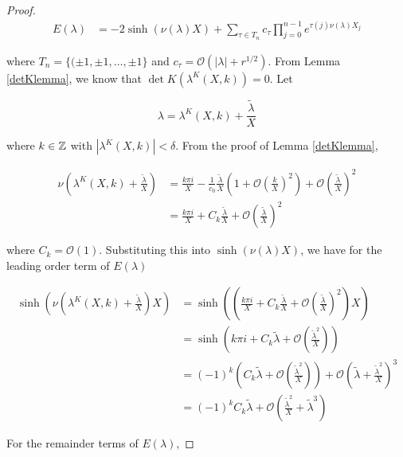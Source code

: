 \documentclass[thesis.tex]{subfiles}
\begin{document}
\begin{lemma}
\begin{proof}
\begin{align*}
E(\lambda)
&= -2 \sinh(\nu(\lambda)X) + \sum_{\tau \in T_n}
c_\tau \prod_{j = 0}^{n-1} e^{\tau(j) \nu(\lambda)X_j}
\end{align*}

where $T_n = \{ (\pm 1, \pm 1, \dots, \pm 1 \}$ and $c_\tau = \mathcal{O}(|\lambda| + r^{1/2})$. From Lemma \ref{detKlemma}, we know that $\det K(\lambda^K(X,k)) = 0$. Let

\[
\lambda = \lambda^K(X,k) + \frac{\tilde{\lambda}}{X}
\]

where $k \in {\mathbb Z}$ with $|\lambda^K(X,k)|  < \delta$. From the proof of Lemma \ref{detKlemma}, 

\begin{align*}
\nu\left( \lambda^K(X, k) + \frac{\tilde{\lambda}}{X} \right) 
&= \frac{k \pi i}{X} -\frac{1}{c_0}\frac{\tilde{\lambda}}{X} \left( 1 + \mathcal{O} \left(\frac{k}{X}\right)^2 \right) + \mathcal{O}\left( \frac{\tilde{\lambda}}{X}\right)^2 \\
&= \frac{k \pi i}{X} + C_k \frac{\tilde{\lambda}}{X} + \mathcal{O}\left( \frac{\tilde{\lambda}}{X}\right)^2 
\end{align*}

where $C_k = \mathcal{O}(1)$. Substituting this into $\sinh(\nu(\lambda)X)$, we have for the leading order term of $E(\lambda)$

\begin{align*}
\sinh\left(\nu\left(\lambda^K(X, k) + \frac{\tilde{\lambda}}{X}\right)X\right)
&= \sinh\left(\left(\frac{k \pi i}{X} + C_k \frac{\tilde{\lambda}}{X} + \mathcal{O}\left( \frac{\tilde{\lambda}}{X}\right)^2 \right) X\right) \\
&= \sinh\left( k \pi i + C_k \tilde{\lambda} + \mathcal{O}\left( \frac{\tilde{\lambda}^2}{X}\right) \right) \\
&= (-1)^k \left( C_k \tilde{\lambda} + \mathcal{O}\left( \frac{\tilde{\lambda}^2}{X}\right) \right) + \mathcal{O}\left( \tilde{\lambda} + \frac{\tilde{\lambda}^2}{X} \right)^3 \\
&= (-1)^k C_k \tilde{\lambda} + \mathcal{O}\left( \frac{\tilde{\lambda}^2}{X} + \tilde{\lambda}^3 \right)
\end{align*}

For the remainder terms of $E(\lambda)$,


\end{proof}
\end{lemma}
\end{document}
